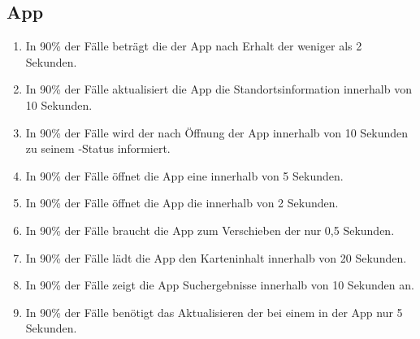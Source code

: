 \subsection{App}

\begin{enumerate}
    \item In 90\% der Fälle beträgt die %
        der App nach Erhalt der %
        weniger als 2 Sekunden.
    \item In 90\% der Fälle aktualisiert die App die Standortsinformation innerhalb von 10 Sekunden.
    \item In 90\% der Fälle wird der %
        nach Öffnung der App innerhalb von 10 Sekunden zu seinem %
        -Status informiert.
    \item In 90\% der Fälle öffnet die App eine %
        innerhalb von 5 Sekunden.
    \item In 90\% der Fälle öffnet die App die %
        innerhalb von 2 Sekunden.
    \item In 90\% der Fälle braucht die App zum Verschieben der %
        nur 0,5 Sekunden.
    \item In 90\% der Fälle lädt die App den Karteninhalt innerhalb von 20 Sekunden.
    \item In 90\% der Fälle zeigt die App Suchergebnisse innerhalb von 10 Sekunden an.
    \item In 90\% der Fälle benötigt das Aktualisieren der %
        bei einem %
        in der App nur 5 Sekunden.
\end{enumerate}